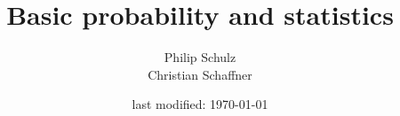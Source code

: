 \documentclass[11pt,leqno,a4paper]{report}
\author{Philip Schulz \\ Christian Schaffner}
\title{Basic probability and statistics}
\date{last modified: \today}
\begin{document}
\begin{titlepage}
\maketitle
\end{titlepage}



\end{document}

